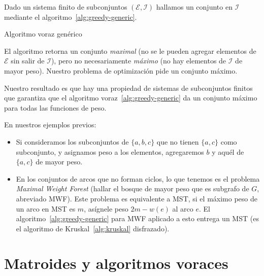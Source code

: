   Dado un sistema finito de subconjuntos \((\mathscr{E}, \mathscr{I})\)
  hallamos un conjunto en \(\mathscr{I}\)
  mediante el algoritmo~\ref{alg:greedy-generic}.
  \begin{algorithm}[ht]
    \DontPrintSemicolon\Indp

    \caption{Algoritmo voraz genérico}
    \label{alg:greedy-generic}
  \end{algorithm}
  El algoritmo retorna un conjunto \emph{maximal}
  (no se le pueden agregar elementos de \(\mathscr{E}\)
   sin salir de \(\mathscr{I}\)),
  pero no necesariamente \emph{máximo}
  (no hay elementos de \(\mathscr{I}\) de mayor peso).
  Nuestro problema de optimización pide un conjunto máximo.

  Nuestro resultado es que hay una propiedad
  de sistemas de subconjuntos finitos
  que garantiza que el algoritmo voraz~\ref{alg:greedy-generic}
  da un conjunto máximo para todas las funciones de peso.

  En nuestros ejemplos previos:
  \begin{itemize}
  \item
    Si consideramos los subconjuntos de \(\{ a, b, c \}\)
    que no tienen \(\{ a, c \}\) como subconjunto,
    y asignamos peso a los elementos,
    agregaremos \(b\) y aquél de \(\{ a, c \}\) de mayor peso.
  \item
    En los conjuntos de arcos que no forman ciclos,
    lo que tenemos
    es el problema \emph{\foreignlanguage{english}{Maximal Weight Forest}}
    (hallar el bosque de mayor peso que es subgrafo de \(G\),
     abreviado MWF).
    Este problema es equivalente a MST,
    si el máximo peso de un arco en MST es \(m\),
    asígnele peso \(2 m - w(e)\) al arco \(e\).
    El algoritmo~\ref{alg:greedy-generic} para MWF aplicado a esto
    entrega un MST
    (es el algoritmo de Kruskal~\ref{alg:kruskal} disfrazado).
  \end{itemize}

\section{Matroides y algoritmos voraces}
\label{sec:matroid-greedy}

